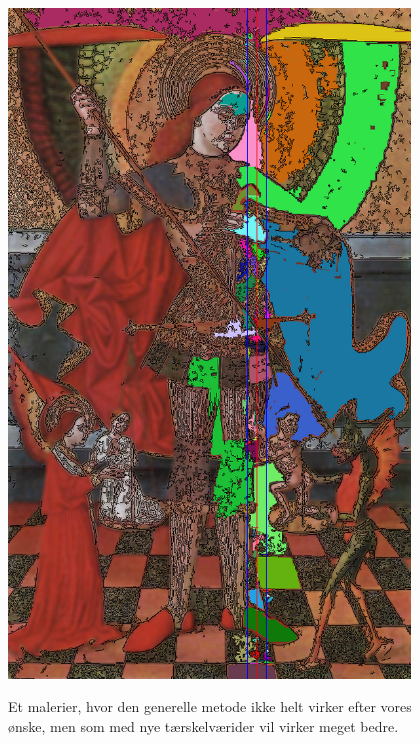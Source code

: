 \begin{figure}[!h]
{        \includegraphics[angle=270,width=0.95\textwidth]{afsnit/afprovning/billeder/thressholds/krafitige_farver/krafite_detalier/s7_e200_f5.png}
        \label{GRD_virker_nesten1_super}}\\
     \caption[]{Et malerier, hvor den generelle metode ikke helt virker efter vores ønske, men som med nye tærskelværider vil virker meget bedre.}
     \label{generelde_region_detektor_virker_nesten1}
\end{figure}

